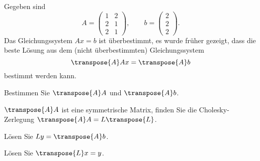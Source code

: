 Gegeben sind
\[
A=\begin{pmatrix}1&2\\2&1\\2&1\end{pmatrix},\qquad
b=\begin{pmatrix}2\\2\\2\end{pmatrix}.
\]
Das Gleichungssystem $Ax=b$ ist überbestimmt, es wurde früher
gezeigt, dass die beste Lösung aus dem (nicht überbestimmten)
Gleichungssystem
\[
\transpose{A}Ax=\transpose{A}b
\]
bestimmt werden kann.
\begin{teilaufgaben}
\item Bestimmen Sie $\transpose{A}A$ und $\transpose{A}b$.
\item $\transpose{A}A$ ist eine symmetrische Matrix, finden Sie die
Cholesky-Zerlegung $\transpose{A}A=L\transpose{L}$.
\item Lösen Sie $Ly=\transpose{A}b$.
\item Lösen Sie $\transpose{L}x=y$.
\end{teilaufgaben}


